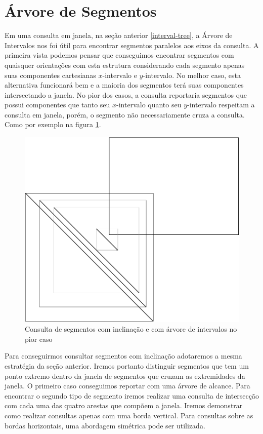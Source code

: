 \section{Árvore de Segmentos}
Em uma consulta em janela, na seção anterior \ref{interval-tree}, a Árvore de Intervalos nos foi útil para encontrar segmentos paralelos aos eixos da consulta. A primeira vista podemos pensar que conseguimos encontrar segmentos com quaisquer orientações com esta estrutura considerando cada segmento apenas suas componentes cartesianas $x$-intervalo e $y$-intervalo. No melhor caso, esta alternativa funcionará bem e a maioria dos segmentos terá suas componentes intersectando a janela. No pior dos casos, a consulta reportaria segmentos que possui componentes que tanto seu $x$-intervalo quanto seu $y$-intervalo respeitam a consulta em janela, porém, o segmento não necessariamente cruza a consulta. Como por exemplo na figura \ref{fig:interval_tree_worst_case}.

\begin{figure}[h!]
    \centering
    \includegraphics[scale=0.5]{images/interval_tree_fail.pdf}
    \caption{Consulta de segmentos com inclinação e com árvore de intervalos no pior caso }
    \label{fig:interval_tree_worst_case}
\end{figure}

Para conseguirmos consultar segmentos com inclinação adotaremos a mesma estratégia da seção anterior. Iremos portanto distinguir segmentos que tem um ponto extremo dentro da janela de segmentos que cruzam as extremidades da janela. O primeiro caso conseguimos reportar com uma árvore de alcance. Para encontrar o segundo tipo de segmento iremos realizar uma consulta de intersecção com cada uma das quatro arestas que compõem a janela. Iremos demonstrar como realizar consultas apenas com uma borda vertical. Para consultas sobre as bordas horizontais, uma abordagem simétrica pode ser utilizada.

